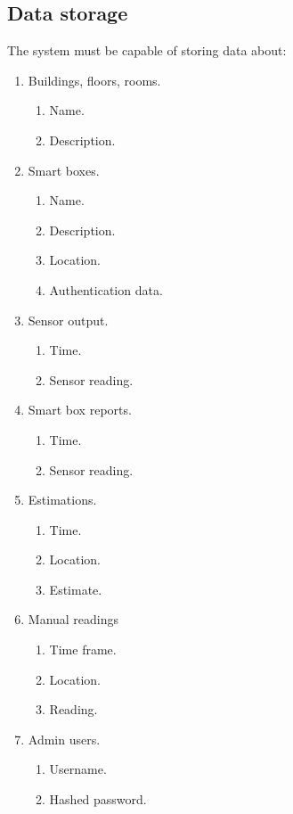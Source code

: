 \documentclass{l4proj}
\begin{document}
\subsection{Data storage}
The system must be capable of storing data about: 
\begin{enumerate}
  \item Buildings, floors, rooms.
\begin{enumerate}
  \item Name.
  \item Description.
\end{enumerate}
  \item Smart boxes.
\begin{enumerate}
  \item Name.
  \item Description.
  \item Location.
  \item Authentication data.
\end{enumerate}
  \item Sensor output.
\begin{enumerate}  
  \item Time.
  \item Sensor reading.
\end{enumerate}
  \item Smart box reports.
\begin{enumerate} 
  \item Time.
  \item Sensor reading.
\end{enumerate}
  \item Estimations.
\begin{enumerate} 
  \item Time.
  \item Location.
  \item Estimate.
\end{enumerate}
  \item Manual readings
\begin{enumerate} 
  \item Time frame.
  \item Location.
  \item Reading.
\end{enumerate}
  \item Admin users.
\begin{enumerate} 
  \item Username.
  \item Hashed password.
\end{enumerate}
\end{enumerate}
\end{document}
